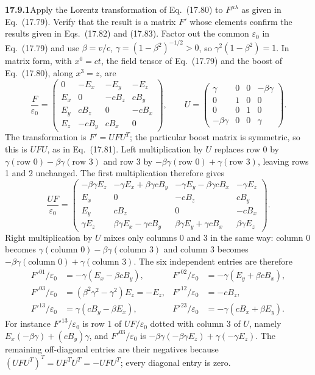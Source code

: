 \par\bigskip
\noindent\textbf{17.9.1}\quad Apply the Lorentz transformation of
Eq.~(17.80) to $F^{\mu\lambda}$ as given in Eq.~(17.79). Verify that
the result is a matrix $F'$ whose elements confirm the results given
in Eqs.~(17.82) and (17.83).
\solution
Factor out the common $\varepsilon_0$ in Eq.~(17.79) and use
$\beta=v/c$, $\gamma=(1-\beta^2)^{-1/2}>0$, so $\gamma^2(1-\beta^2)=1$.
In matrix form, with $x^0=ct$, the field tensor of Eq.~(17.79) and
the boost of Eq.~(17.80), along $x^3=z$, are
\[
\frac{F}{\varepsilon_0}=\begin{pmatrix}
0&-E_x&-E_y&-E_z\\
E_x&0&-cB_z&cB_y\\
E_y&cB_z&0&-cB_x\\
E_z&-cB_y&cB_x&0
\end{pmatrix},\qquad
U=\begin{pmatrix}
\gamma&0&0&-\beta\gamma\\
0&1&0&0\\
0&0&1&0\\
-\beta\gamma&0&0&\gamma
\end{pmatrix}.
\]
The transformation is $F'=UFU^T$; the particular boost matrix
is symmetric, so this is $UFU$, as in Eq.~(17.81).
Left multiplication by $U$ replaces row 0 by
$\gamma(\text{row }0)-\beta\gamma(\text{row }3)$ and row 3 by
$-\beta\gamma(\text{row }0)+\gamma(\text{row }3)$, leaving rows 1
and 2 unchanged. The first multiplication therefore gives
\[
\frac{UF}{\varepsilon_0}=
\begin{pmatrix}
-\beta\gamma E_z&
-\gamma E_x+\beta\gamma cB_y&
-\gamma E_y-\beta\gamma cB_x&-\gamma E_z\\
E_x&0&-cB_z&cB_y\\
E_y&cB_z&0&-cB_x\\
\gamma E_z&\beta\gamma E_x-\gamma cB_y&
\beta\gamma E_y+\gamma cB_x&\beta\gamma E_z
\end{pmatrix}.
\]
Right multiplication by $U$ mixes only columns 0 and 3 in the same
way: column 0 becomes
$\gamma(\text{column }0)-\beta\gamma(\text{column }3)$ and column 3
becomes $-\beta\gamma(\text{column }0)+\gamma(\text{column }3)$.
The six independent entries are therefore
\[
\begin{aligned}
F'^{01}/\varepsilon_0&=-\gamma(E_x-\beta cB_y),&
F'^{02}/\varepsilon_0&=-\gamma(E_y+\beta cB_x),\\
F'^{03}/\varepsilon_0&=(\beta^2\gamma^2-\gamma^2)E_z=-E_z,&
F'^{12}/\varepsilon_0&=-cB_z,\\
F'^{13}/\varepsilon_0&=\gamma(cB_y-\beta E_x),&
F'^{23}/\varepsilon_0&=-\gamma(cB_x+\beta E_y).
\end{aligned}
\]
For instance $F'^{13}/\varepsilon_0$ is row 1 of $UF/\varepsilon_0$
dotted with column 3 of $U$, namely
$E_x(-\beta\gamma)+(cB_y)\gamma$, and $F'^{03}/\varepsilon_0$ is
$-\beta\gamma(-\beta\gamma E_z)+\gamma(-\gamma E_z)$.
The remaining off-diagonal entries are their negatives because
$(UFU^T)^T=UF^TU^T=-UFU^T$; every diagonal entry is zero.

